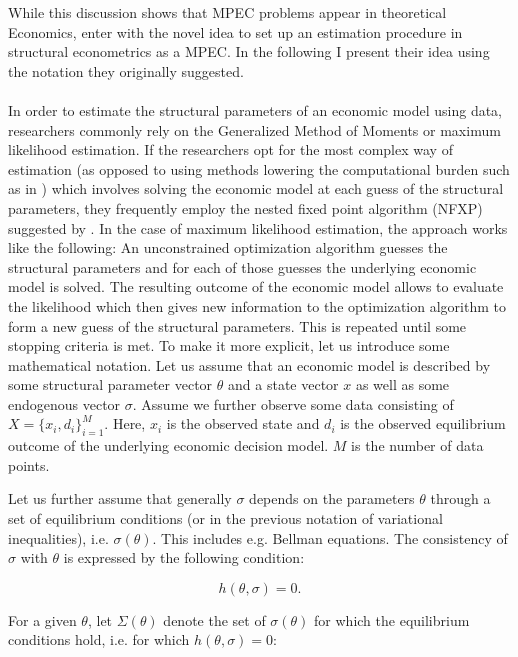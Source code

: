 While this discussion shows that MPEC problems appear in theoretical Economics, \cite{Su.Judd.2012} enter with the novel idea to set up an estimation procedure in structural econometrics as a MPEC. In the following I present their idea using the notation they originally suggested.

\paragraph{}
In order to estimate the structural parameters of an economic model using data, researchers commonly rely on the Generalized Method of Moments or maximum likelihood estimation. If the researchers opt for the most complex way of estimation (as opposed to using methods lowering the computational burden such as in \cite{Hotz.Miller.1993}) which involves solving the economic model at each guess of the structural parameters, they frequently employ the nested fixed point algorithm (NFXP) suggested by \cite{Rust.1987}. In the case of maximum likelihood estimation, the approach works like the following: An unconstrained optimization algorithm guesses the structural parameters and for each of those guesses the underlying economic model is solved. The resulting outcome of the economic model allows to evaluate the likelihood which then gives new information to the optimization algorithm to form a new guess of the structural parameters. This is repeated until some stopping criteria is met. To make it more explicit, let us introduce some mathematical notation. Let us assume that an economic model is described by some structural parameter vector $\theta$ and a state vector $x$ as well as some endogenous vector $\sigma$. Assume we further observe some data consisting of $X = \{x_i, d_i\}^M_{i=1}$. Here, $x_i$ is the observed state and $d_i$ is the observed equilibrium outcome of the underlying economic decision model. $M$ is the number of data points.

Let us further assume that generally $\sigma$ depends on the parameters $\theta$ through a set of equilibrium conditions (or in the previous notation of variational inequalities), i.e. $\sigma(\theta)$. This includes e.g. Bellman equations. The consistency of $\sigma$ with $\theta$ is expressed by the following condition:

\begin{equation}
h(\theta, \sigma) = 0.
\end{equation}

For a given $\theta$, let $\Sigma(\theta)$ denote the set of $\sigma(\theta)$ for which the equilibrium conditions hold, i.e. for which $h(\theta,\sigma)=0$:

